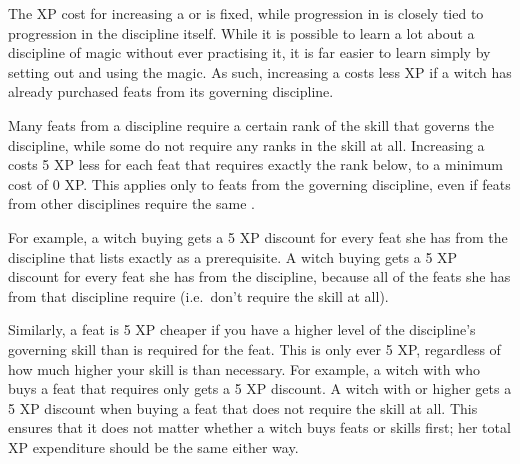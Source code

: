 
The XP cost for increasing a {\generalskill} or {\specialityskill} is fixed, while progression in {\disciplineskills} is closely tied to progression in the discipline itself.
While it is possible to learn a lot about a discipline of magic without ever practising it, it is far easier to learn simply by setting out and using the magic.
As such, increasing a {\disciplineskill} costs less XP if a witch has already purchased feats from its governing discipline.

Many feats from a discipline require a certain rank of the skill that governs the discipline, while some do not require any ranks in the skill at all.
Increasing a {\disciplineskill} costs 5 XP less for each feat that requires exactly the rank below, to a minimum cost of 0 XP.
This applies only to feats from the governing discipline, even if feats from other disciplines require the same {\disciplineskill}.

For example, a witch buying  gets a 5 XP discount for every feat she has from the  discipline that lists exactly  as a prerequisite.
A witch buying  gets a 5 XP discount for every feat she has from the  discipline, because all of the feats she has from that discipline require  (i.e.\ don't require the  skill at all).

Similarly, a feat is 5 XP cheaper if you have a higher level of the discipline's governing skill than is required for the feat.
This is only ever 5 XP, regardless of how much higher your skill is than necessary.
For example, a witch with  who buys a  feat that requires only  gets a 5 XP discount.
A witch with  or higher gets a 5 XP discount when buying a  feat that does not require the  skill at all.
This ensures that it does not matter whether a witch buys feats or skills first; her total XP expenditure should be the same either way.


